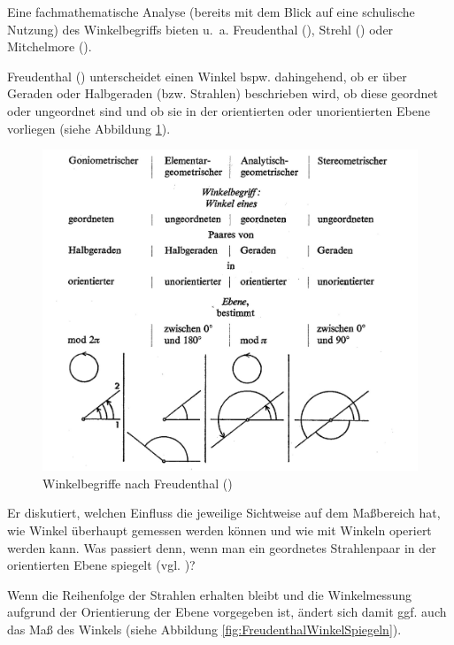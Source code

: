 \documentclass[
]{scrbook}
\theoremstyle{definition}
\theoremstyle{definition}
\theoremstyle{definition}
\theoremstyle{definition}
\theoremstyle{remark}
\begin{document}
Eine fachmathematische Analyse (bereits mit dem Blick auf eine schulische Nutzung) des Winkelbegriffs bieten u.~a. Freudenthal (), Strehl () oder Mitchelmore ().

Freudenthal () unterscheidet einen Winkel bspw. dahingehend, ob er über Geraden oder Halbgeraden (bzw. Strahlen) beschrieben wird, ob diese geordnet oder ungeordnet sind und ob sie in der orientierten oder unorientierten Ebene vorliegen (siehe Abbildung \ref{fig:FreudenthalWinkel}).



\begin{figure}

{\centering \includegraphics[width=0.75\linewidth]{pictures/1-FreudenthalWinkel} 

}

\caption{Winkelbegriffe nach Freudenthal ()}\label{fig:FreudenthalWinkel}
\end{figure}

Er diskutiert, welchen Einfluss die jeweilige Sichtweise auf dem Maßbereich hat, wie Winkel überhaupt gemessen werden können und wie mit Winkeln operiert werden kann. Was passiert denn, wenn man ein geordnetes Strahlenpaar in der orientierten Ebene spiegelt (vgl. )?

Wenn die Reihenfolge der Strahlen erhalten bleibt und die Winkelmessung aufgrund der Orientierung der Ebene vorgegeben ist, ändert sich damit ggf. auch das Maß des Winkels (siehe Abbildung \ref{fig:FreudenthalWinkelSpiegeln}).
\end{document}
